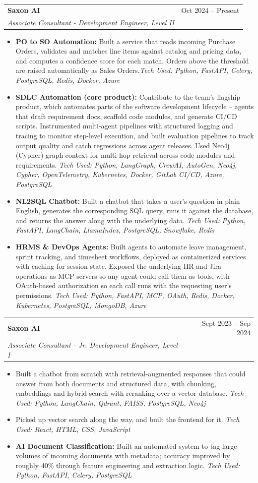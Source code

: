 \documentclass[letterpaper,11pt]{article}
\makeatletter
\newcommand{\resumeItem}[1]{
  \item\small{#1 \vspace{0pt}}
}
\newcommand{\resumeSubheading}[4]{
  \vspace{1pt}\item
    \begin{tabular*}{0.97\textwidth}[t]{l@{\extracolsep{\fill}}r}
      \textbf{#1} & \small #2 \\
      \textit{\small#3} & \textit{\small #4} \\
    \end{tabular*}\vspace{-4pt}
}
\newcommand{\resumeItemListStart}{\begin{itemize}[leftmargin=0.2in, itemsep=1pt]}
\newcommand{\resumeItemListEnd}{\end{itemize}\vspace{1pt}}
\makeatother
\begin{document}
  \resumeSubheading
      {Saxon AI}{Oct 2024 -- Present}
      {Associate Consultant - Development Engineer, Level II}{}
      \resumeItemListStart
        \resumeItem{\textbf{PO to SO Automation:} Built a service that reads incoming Purchase Orders, validates and matches line items against catalog and pricing data, and computes a confidence score for each match. Orders above the threshold are raised automatically as Sales Orders.\textit{Tech Used: Python, FastAPI, Celery, PostgreSQL, Redis, Docker, Azure}}
        \resumeItem{\textbf{SDLC Automation (core product):} Contribute to the team's flagship product, which automates parts of the software development lifecycle -- agents that draft requirement docs, scaffold code modules, and generate CI/CD scripts. Instrumented multi-agent pipelines with structured logging and tracing to monitor step-level execution, and built evaluation pipelines to track output quality and catch regressions across agent releases. Used Neo4j (Cypher) graph context for multi-hop retrieval across code modules and requirements. \textit{Tech Used: Python, LangGraph, CrewAI, AutoGen, Neo4j, Cypher, OpenTelemetry, Kubernetes, Docker, GitLab CI/CD, Azure, PostgreSQL}}
        \resumeItem{\textbf{NL2SQL Chatbot:} Built a chatbot that takes a user's question in plain English, generates the corresponding SQL query, runs it against the database, and returns the answer along with the underlying data. \textit{Tech Used: Python, FastAPI, LangChain, LlamaIndex, PostgreSQL, Snowflake, Redis}}
        \resumeItem{\textbf{HRMS \& DevOps Agents:} Built agents to automate leave management, sprint tracking, and timesheet workflows, deployed as containerized services with caching for session state. Exposed the underlying HR and Jira operations as MCP servers so any agent could call them as tools, with OAuth-based authorization so each call runs with the requesting user's permissions. \textit{Tech Used: Python, FastAPI, MCP, OAuth, Redis, Docker, Kubernetes, PostgreSQL, MongoDB, Azure}}
      \resumeItemListEnd

    \resumeSubheading
      {Saxon AI}{Sept 2023 -- Sep 2024}
      {Associate Consultant - Jr. Development Engineer, Level I}{}
      \resumeItemListStart
        \resumeItem{Built a chatbot from scratch with retrieval-augmented responses that could answer from both documents and structured data, with chunking, embeddings and hybrid search with reranking over a vector database. \textit{Tech Used: Python, LangChain, Qdrant, FAISS, PostgreSQL, Neo4j}}
        \resumeItem{Picked up vector search along the way, and built the frontend for it. \textit{Tech Used: React, HTML, CSS, JavaScript}}
        \resumeItem{\textbf{AI Document Classification:} Built an automated system to tag large volumes of incoming documents with metadata; accuracy improved by roughly 40\% through feature engineering and extraction logic. \textit{Tech Used: Python, FastAPI, Celery, PostgreSQL}}
      \resumeItemListEnd
\end{document}
